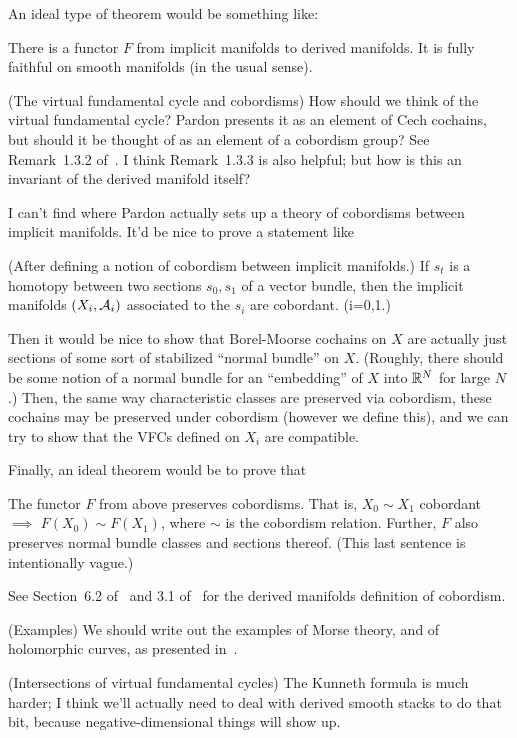 					An ideal type of theorem would be something like:
						\begin{theorem}
						There is a functor $F$ from implicit manifolds to derived manifolds. It is fully faithful on smooth manifolds (in the usual sense).
						\end{theorem}
			\enumd
	\item (The virtual fundamental cycle and cobordisms)
		How should we think of the virtual fundamental cycle? Pardon presents it as an element of Cech cochains, but should it be thought of as an element of a cobordism group? See Remark~1.3.2 of~\cite{pardon}. I think Remark~1.3.3 is also helpful; but how is this an invariant of the derived manifold itself?
			\enum
				\item
					I can't find where Pardon actually sets up a theory of cobordisms between implicit manifolds. It'd be nice to prove a statement like
					\begin{theorem}
					(After defining a notion of cobordism between implicit manifolds.) If $s_t$ is a homotopy between two sections $s_0, s_1$ of a vector bundle, then the implicit manifolds $(X_i, \mathcal A_i)$ associated to the $s_i$ are cobordant. (i=0,1.)
					\end{theorem}
				\item
					Then it would be nice to show that Borel-Moorse cochains on $X$ are actually just sections of some sort of stabilized ``normal bundle'' on $X$. (Roughly, there should be some notion of a normal bundle for an ``embedding'' of $X$ into $\mathbb R^N$ for large $N$.) Then, the same way characteristic classes are preserved via cobordism, these cochains may be preserved under cobordism (however we define this), and we can try to show that the VFCs defined on $X_i$ are compatible.
				\item
					Finally, an ideal theorem would be to prove that 
					\begin{theorem}
						The functor $F$ from above preserves cobordisms. That is, $X_0 \sim X_1$ cobordant $\implies$ $F(X_0) \sim F(X_1)$, where $\sim$ is the cobordism relation. Further, $F$ also preserves normal bundle classes and sections thereof. (This last sentence is intentionally vague.)
					\end{theorem}
					See Section~6.2 of~\cite{spivak-thesis} and 3.1 of~\cite{spivak} for the derived manifolds definition of cobordism.
			\enumd
	\item (Examples)
		We should write out the examples of Morse theory, and of holomorphic curves, as presented in~\cite{pardon}.
	\item (Intersections of virtual fundamental cycles)
		The Kunneth formula is much harder; I think we'll actually need to deal with derived smooth stacks to do that bit, because negative-dimensional things will show up.
		
\enumd



